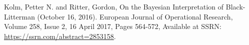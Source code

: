 \documentclass[11pt]{article}
\theoremstyle{plain} %
\theoremstyle{remark}
\begin{document}
\newpage 
\begin{thebibliography}{1}

  Kolm, Petter N. and Ritter, Gordon, On the Bayesian Interpretation of
  Black-Litterman (October 16, 2016). European Journal of Operational Research,
  Volume 258, Issue 2, 16 April 2017, Pages 564-572, Available at SSRN:
  \href{https://ssrn.com/abstract=2853158}{https://ssrn.com/abstract=2853158}.

\end{thebibliography}
\end{document}
